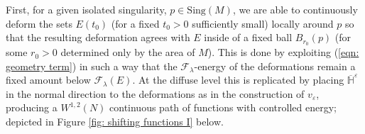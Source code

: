 \documentclass[11pt]{article}
\begin{document}
First, for a given isolated singularity, $p \in \mathrm{Sing}(M)$, we are able to continuously deform the sets $E(t_0)$ (for a fixed $t_0 > 0$ sufficiently small) locally around $p$ so that the resulting deformation agrees with $E$ inside of a fixed ball $B_{r_0}(p)$ (for some $r_0 > 0$ determined only by the area of $M$). This is done by exploiting (\ref{eqn: geometry term}) in such a way that the $\mathcal{F}_\lambda$-energy of the deformations remain a fixed amount below $\mathcal{F}_\lambda(E)$. At the diffuse level this is replicated by placing $\overline{\mathbb{H}}^\varepsilon$ in the normal direction to the deformations as in the construction of $v_\varepsilon$, 
producing a $W^{1,2}(N)$ continuous path of functions with controlled energy; depicted in Figure \ref{fig: shifting functions I} below.
\bigskip
\begin{figure}[H]
\centering
\captionsetup{justification=justified,margin=1cm}
\begin{tikzpicture}[x=0.75pt,y=0.75pt,yscale=-1,xscale=1]


\end{tikzpicture}
\end{figure}
\end{document}
